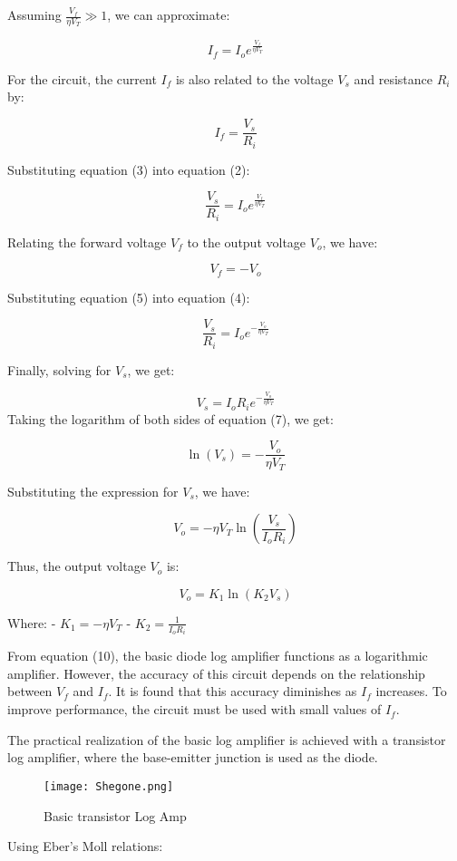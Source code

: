 \documentclass[a4paper,9pt,twoside,openany,twocolumn]{memoir}
\begin{document}
Assuming \( \frac{V_f}{\eta V_T} \gg 1 \), we can approximate:

\[
I_f = I_o e^{\frac{V_f}{\eta V_T}} \tag{2}
\]

For the circuit, the current \( I_f \) is also related to the voltage \( V_s \) and resistance \( R_i \) by:

\[
I_f = \frac{V_s}{R_i} \tag{3}
\]

Substituting equation (3) into equation (2):

\[
\frac{V_s}{R_i} = I_o e^{\frac{V_f}{\eta V_T}} \tag{4}
\]

Relating the forward voltage \( V_f \) to the output voltage \( V_o \), we have:

\[
V_f = -V_o \tag{5}
\]

Substituting equation (5) into equation (4):

\[
\frac{V_s}{R_i} = I_o e^{-\frac{V_o}{\eta V_T}} \tag{6}
\]

Finally, solving for \( V_s \), we get:

\[
V_s = I_o R_i e^{-\frac{V_o}{\eta V_T}} \tag{7}
\]
Taking the logarithm of both sides of equation (7), we get:

\[
\ln(V_s) = -\frac{V_o}{\eta V_T} \tag{8}
\]

Substituting the expression for \( V_s \), we have:

\[
V_o = -\eta V_T \ln \left( \frac{V_s}{I_o R_i} \right) \tag{9}
\]

Thus, the output voltage \( V_o \) is:

\[
V_o = K_1 \ln(K_2 V_s) \tag{10}
\]

Where:
- \( K_1 = -\eta V_T \)
- \( K_2 = \frac{1}{I_o R_i} \)

From equation (10), the basic diode log amplifier functions as a logarithmic amplifier. However, the accuracy of this circuit depends on the relationship between \( V_f \) and \( I_f \). It is found that this accuracy diminishes as \( I_f \) increases. To improve performance, the circuit must be used with small values of \( I_f \).

The practical realization of the basic log amplifier is achieved with a transistor log amplifier, where the base-emitter junction is used as the diode.
\begin{figure}[H]
    \centering
    \texttt{[image: Shegone.png]}
    \caption{Basic transistor Log Amp}
    \label{fig:question_image}
\end{figure}
Using Eber's Moll relations:
\end{document}
